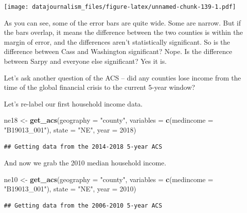 \documentclass[]{book}
\newenvironment{Shaded}{\begin{snugshade}}{\end{snugshade}}
\newcommand{\DataTypeTok}[1]{\textcolor[rgb]{0.13,0.29,0.53}{#1}}
\newcommand{\DecValTok}[1]{\textcolor[rgb]{0.00,0.00,0.81}{#1}}
\newcommand{\KeywordTok}[1]{\textcolor[rgb]{0.13,0.29,0.53}{\textbf{#1}}}
\newcommand{\NormalTok}[1]{#1}
\newcommand{\StringTok}[1]{\textcolor[rgb]{0.31,0.60,0.02}{#1}}
\begin{document}
\texttt{[image: datajournalism\_files/figure-latex/unnamed-chunk-139-1.pdf]}

As you can see, some of the error bars are quite wide. Some are narrow. But if the bars overlap, it means the difference between the two counties is within the margin of error, and the differences aren't statistically significant. So is the difference between Cass and Washington significant? Nope. Is the difference between Sarpy and everyone else significant? Yes it is.

Let's ask another question of the ACS -- did any counties lose income from the time of the global financial crisis to the current 5-year window?

Let's re-label our first household income data.

\begin{Shaded}
\begin{Highlighting}[]
\NormalTok{ne18 <-}\StringTok{ }\KeywordTok{get_acs}\NormalTok{(}\DataTypeTok{geography =} \StringTok{"county"}\NormalTok{, }
              \DataTypeTok{variables =} \KeywordTok{c}\NormalTok{(}\DataTypeTok{medincome =} \StringTok{"B19013_001"}\NormalTok{), }
              \DataTypeTok{state =} \StringTok{"NE"}\NormalTok{, }
              \DataTypeTok{year =} \DecValTok{2018}\NormalTok{)}
\end{Highlighting}
\end{Shaded}

\begin{verbatim}
## Getting data from the 2014-2018 5-year ACS
\end{verbatim}

And now we grab the 2010 median household income.

\begin{Shaded}
\begin{Highlighting}[]
\NormalTok{ne10 <-}\StringTok{ }\KeywordTok{get_acs}\NormalTok{(}\DataTypeTok{geography =} \StringTok{"county"}\NormalTok{, }
              \DataTypeTok{variables =} \KeywordTok{c}\NormalTok{(}\DataTypeTok{medincome =} \StringTok{"B19013_001"}\NormalTok{), }
              \DataTypeTok{state =} \StringTok{"NE"}\NormalTok{, }
              \DataTypeTok{year =} \DecValTok{2010}\NormalTok{)}
\end{Highlighting}
\end{Shaded}

\begin{verbatim}
## Getting data from the 2006-2010 5-year ACS
\end{verbatim}
\end{document}
